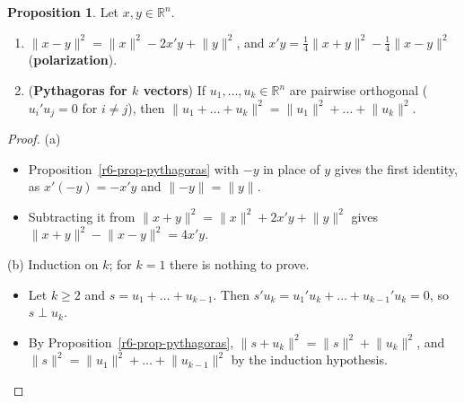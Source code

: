 \documentclass[12pt]{article}
\newcommand{\R}{\mathbb R}
\theoremstyle{definition}
\newtheorem{proposition}[theorem]{Proposition}
\begin{document}
\begin{proposition}\label{r6-prop-polarization}
Let \(x,y\in\R^n\).
\begin{enumerate}
\item \(\lVert x-y\rVert^2=\lVert x\rVert^2-2x'y+\lVert y\rVert^2\), and
\(x'y=\frac14\lVert x+y\rVert^2-\frac14\lVert x-y\rVert^2\) (\textbf{polarization}).
\item (\textbf{Pythagoras for \(k\) vectors}) If \(u_1,\dots,u_k\in\R^n\) are pairwise orthogonal
(\(u_i'u_j=0\) for \(i\ne j\)), then \(\lVert u_1+\dots+u_k\rVert^2=\lVert u_1\rVert^2+\dots+\lVert u_k\rVert^2\).
\end{enumerate}
\end{proposition}
\begin{proof}
(a)
\begin{itemize}
\item Proposition~\ref{r6-prop-pythagoras} with \(-y\) in place of \(y\) gives the first identity, as
\(x'(-y)=-x'y\) and \(\lVert-y\rVert=\lVert y\rVert\).
\item Subtracting it from \(\lVert x+y\rVert^2=\lVert x\rVert^2+2x'y+\lVert y\rVert^2\) gives
\(\lVert x+y\rVert^2-\lVert x-y\rVert^2=4x'y\).
\end{itemize}
(b) Induction on \(k\); for \(k=1\) there is nothing to prove.
\begin{itemize}
\item Let \(k\geqslant2\) and \(s=u_1+\dots+u_{k-1}\). Then \(s'u_k=u_1'u_k+\dots+u_{k-1}'u_k=0\), so
\(s\perp u_k\).
\item By Proposition~\ref{r6-prop-pythagoras}, \(\lVert s+u_k\rVert^2=\lVert s\rVert^2+\lVert u_k\rVert^2\), and
\(\lVert s\rVert^2=\lVert u_1\rVert^2+\dots+\lVert u_{k-1}\rVert^2\) by the induction hypothesis.\qedhere
\end{itemize}
\end{proof}
\end{document}
